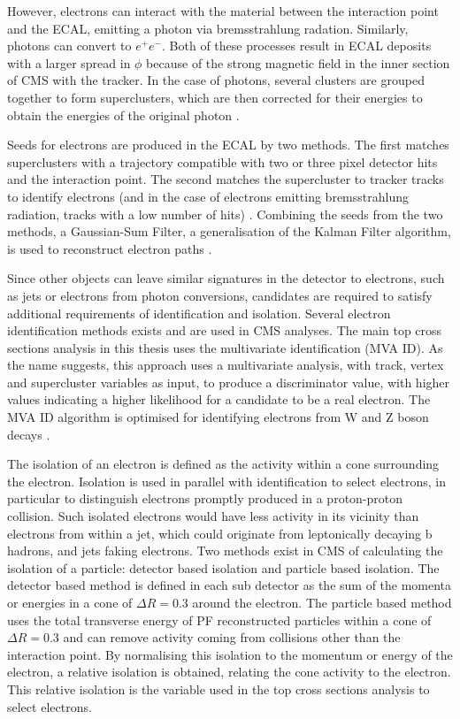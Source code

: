 However, electrons can interact with the material between the interaction point and the ECAL, emitting a
photon via bremsstrahlung radation. Similarly, photons can convert to $e^{+}e^{-}$. Both of these processes
result in ECAL deposits with a larger spread in $\phi$ because of the strong magnetic field in the inner
section of CMS with the tracker. In the case of photons, several clusters are grouped together to form superclusters,
which are then corrected for their energies to obtain the energies of the original photon
\cite{photon_reconstruction}.

Seeds for electrons are produced in the ECAL by two methods. The first matches superclusters with a trajectory
compatible with two or three pixel detector hits and the interaction point. The second matches the
supercluster to tracker tracks to identify electrons (and in the case of electrons emitting bremsstrahlung
radiation, tracks with a low number of hits) \cite{electron_reconstruction}. Combining the seeds from the two
methods, a Gaussian-Sum Filter, a generalisation of the Kalman Filter algorithm, is used to reconstruct
electron paths \cite{electrons_GSF}.

Since other objects can leave similar signatures in the detector to electrons, such as jets or electrons from
photon conversions, candidates are required to satisfy additional requirements of identification and
isolation. Several electron identification methods exists and are used in CMS analyses. The main top cross
sections analysis in this thesis uses the multivariate identification (MVA ID). As the name suggests, this
approach uses a multivariate analysis, with track, vertex and supercluster variables as input, to produce a
discriminator value, with higher values indicating a higher likelihood for a candidate to be a real electron.
The MVA ID algorithm is optimised for identifying electrons from W and Z boson decays
\cite{electron_reconstruction}.

The isolation of an electron is defined as the activity within a cone surrounding the electron. Isolation is
used in parallel with identification to select electrons, in particular to distinguish electrons promptly
produced in a proton-proton collision. Such isolated electrons would have less activity in its vicinity than
electrons from within a jet, which could originate from leptonically decaying b hadrons, and jets faking
electrons. Two methods exist in CMS of calculating the isolation of a particle: detector based isolation and
particle based isolation. The detector based method is defined in each sub detector as the sum of the momenta
or energies in a cone of $\Delta R = 0.3$ around the electron. The particle based method uses the total
transverse energy of PF reconstructed particles within a cone of $\Delta R = 0.3$ and can remove activity
coming from collisions other than the interaction point. By normalising this isolation to the momentum or
energy of the electron, a relative isolation is obtained, relating the cone activity to the electron. This
relative isolation is the variable used in the top cross sections analysis to select electrons. %

